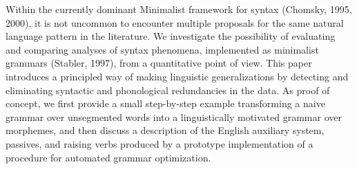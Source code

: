 Within the currently dominant Minimalist framework for syntax (Chomsky, 1995, 2000), it is not uncommon to encounter multiple proposals for the same natural language pattern in the literature. We investigate the possibility of evaluating and comparing analyses of syntax phenomena, implemented as minimalist grammars (Stabler, 1997), from a quantitative point of view. This paper introduces a principled way of making linguistic generalizations by detecting and eliminating syntactic and phonological redundancies in the data. As proof of concept, we first provide a small step-by-step example transforming a naive grammar over unsegmented words into a linguistically motivated grammar over morphemes, and then discuss a description of the English auxiliary system, passives, and raising verbs produced by a prototype implementation of a procedure for automated grammar optimization.
